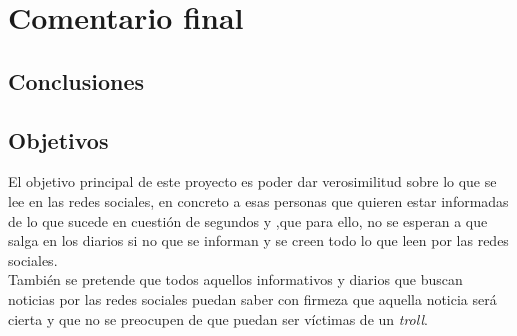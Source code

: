 \documentclass[../all.tex]{subfiles}
\begin{document}
\section{Comentario final} 
\subsection{Conclusiones} %

\newpage
\subsection{Objetivos} %
El objetivo principal de este proyecto es poder dar verosimilitud sobre lo que se lee en las redes sociales, en concreto a esas personas que quieren estar informadas de lo que sucede en cuestión de segundos y ,que para ello, no se esperan a que salga en los diarios si no que se informan y se creen todo lo que leen por las redes sociales.\\
También se pretende que todos aquellos informativos y diarios que buscan noticias por las redes sociales puedan saber con firmeza que aquella noticia será cierta y que no se preocupen de que puedan ser víctimas de un \textit{troll}. 
\end{document}

